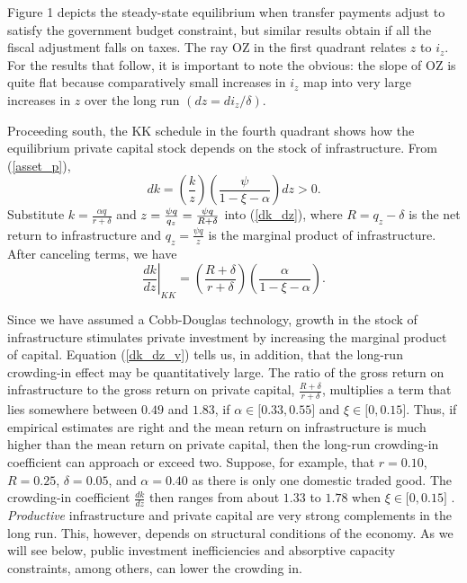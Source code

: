 \documentclass[11pt]{article}
\begin{document}
Figure 1 depicts the steady-state equilibrium when transfer payments adjust
to satisfy the government budget constraint, but similar results obtain if
all the fiscal adjustment falls on taxes. The ray OZ in the first quadrant
relates $z$ to $i_{z}$. For the results that follow, it is important to note
the obvious: the slope of OZ is quite flat because comparatively small
increases in $i_{z}$ map into very large increases in $z$ over the long run $%
(dz=di_{z}/\delta )$.

Proceeding south, the KK schedule in the fourth quadrant shows how the
equilibrium private capital stock depends on the stock of infrastructure.
From (\ref{asset_p}), 
\begin{equation}
dk=\left( \frac{k}{z}\right) \left( \frac{\psi }{1-\xi -\alpha }\right) dz>0.
\label{dk_dz}
\end{equation}%
Substitute $k=\frac{\alpha q}{r+\delta }$ and $z=\frac{\psi q}{q_{z}}=\frac{%
\psi q}{R+\delta }$ into (\ref{dk_dz}), where $R=q_{z}-\delta $ is the net
return to infrastructure and $q_{z}=\frac{\psi q}{z}$ is the marginal
product of infrastructure. After canceling terms, we have 
\begin{equation}
\left. \frac{dk}{dz}\right\vert _{KK}=\left( \frac{R+\delta }{r+\delta }%
\right) \left( \frac{\alpha }{1-\xi -\alpha }\right) .  \label{dk_dz_v}
\end{equation}

Since we have assumed a Cobb-Douglas technology, growth in the stock of
infrastructure stimulates private investment by increasing the marginal
product of capital. Equation (\ref{dk_dz_v}) tells us, in addition, that the
long-run crowding-in effect may be quantitatively large. The ratio of the
gross return on infrastructure to the gross return on private capital, $%
\frac{R+\delta }{r+\delta }$, multiplies a term that lies somewhere between $%
0.49$ and $1.83$, if $\alpha \in \lbrack 0.33,0.55]$ and $\xi \in \lbrack
0,0.15]$. Thus, if empirical estimates are right and the mean return on
infrastructure is much higher than the mean return on private capital, then
the long-run crowding-in coefficient can approach or exceed two. Suppose,
for example, that $r=0.10$, $R=0.25$, $\delta =0.05$, and $\alpha =0.40$ as
there is only one domestic traded good. The crowding-in coefficient $\frac{dk%
}{dz}$ then ranges from about $1.33$ to $1.78$ when $\xi \in \lbrack 0,0.15]$%
. \textit{Productive} infrastructure and private capital are very strong
complements in the long run. This, however, depends on structural conditions
of the economy. As we will see below, public investment inefficiencies and
absorptive capacity constraints, among others, can lower the crowding in.
\end{document}
